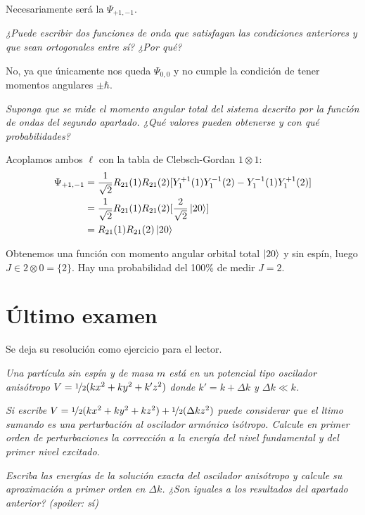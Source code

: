 Necesariamente será la $\Psi_{+1,-1}$.

\begin{tcolorbox}[halign=left]
  \emph{¿Puede escribir dos funciones de onda que satisfagan las
    condiciones anteriores y que sean ortogonales entre sí? ¿Por qué?}
\end{tcolorbox}

No, ya que únicamente nos queda $\Psi_{0,0}$ y no cumple la condición de tener momentos angulares $\pm \hbar$.

\begin{tcolorbox}[halign=left]
  \emph{Suponga que se mide el momento angular total del sistema
    descrito por la función de ondas del segundo apartado. ¿Qué
    valores pueden obtenerse y con qué probabilidades?}
\end{tcolorbox}

Acoplamos ambos $\ell$ con la tabla de Clebsch-Gordan $1\otimes 1$:
\begin{equation}
  \begin{split}
    \Psi_{+1,-1} &= \frac{1}{\sqrt{2}}R_{21}(1)R_{21}(2) [Y_1^{+1}(1)Y_1^{-1}(2)-Y_1^{-1}(1)Y_1^{+1}(2)] \\
     &= \frac{1}{\sqrt{2}}R_{21}(1)R_{21}(2) [\frac{2}{\sqrt{2}} \ket{2 0}] \\
     &= R_{21}(1)R_{21}(2) \ket{2 0} \\
  \end{split}
\end{equation}

Obtenemos una función con momento angular orbital total $\ket{2 0}$ y sin espín, luego $J\in 2\otimes 0 = \{2\}$. Hay una probabilidad del 100\% de medir $J=2$.

\chapter{Último examen}
Se deja su resolución como ejercicio para el lector.

\begin{tcolorbox}[halign=left]
  \emph{Una partícula sin espín y de masa $m$ está en un potencial
    tipo oscilador anisótropo $V={\nicefrac{1}{2}} (kx^2+ky^2+k'z^2)$ donde
    $k'=k+\Delta k$ y $\Delta k \ll k$.}

  \emph{Si escribe $V={\nicefrac{1}{2}} (kx^2+ky^2 +kz^2) + {\nicefrac{1}{2}}(\Delta k z^2)$ puede
  considerar que el ltimo sumando es una perturbación al oscilador
  armónico isótropo. Calcule en primer orden de perturbaciones la
  corrección a la energía del nivel fundamental y del primer nivel excitado. }

\emph{Escriba las energías de la solución exacta del oscilador
  anisótropo y calcule su aproximación a primer orden en $\Delta k$.
  ¿Son iguales a los resultados del apartado anterior? (spoiler: sí)}
\end{tcolorbox}

